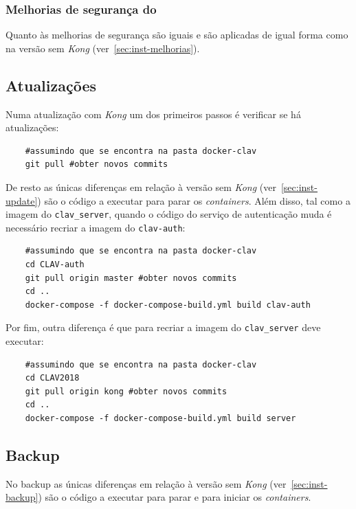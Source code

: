 \subsubsection{Melhorias de segurança do }

Quanto às melhorias de segurança são iguais e são aplicadas de igual forma como na versão sem \textit{Kong} (ver~\ref{sec:inst-melhorias}).

\subsection{Atualizações}

Numa atualização com \textit{Kong} um dos primeiros passos é verificar se há atualizações:
\footnotesize
\begin{verbatim}
    #assumindo que se encontra na pasta docker-clav
    git pull #obter novos commits
\end{verbatim}
\normalsize

De resto as únicas diferenças em relação à versão sem \textit{Kong} (ver~\ref{sec:inst-update}) são o código a executar para parar os \textit{containers}. Além disso, tal como a imagem do \texttt{clav\_server}, quando o código do serviço de autenticação muda é necessário recriar a imagem do \texttt{clav-auth}:

\footnotesize
\begin{verbatim}
    #assumindo que se encontra na pasta docker-clav
    cd CLAV-auth
    git pull origin master #obter novos commits
    cd ..
    docker-compose -f docker-compose-build.yml build clav-auth
\end{verbatim}
\normalsize

Por fim, outra diferença é que para recriar a imagem do \texttt{clav\_server} deve executar:

\footnotesize
\begin{verbatim}
    #assumindo que se encontra na pasta docker-clav
    cd CLAV2018
    git pull origin kong #obter novos commits
    cd ..
    docker-compose -f docker-compose-build.yml build server
\end{verbatim}
\normalsize

\subsection{Backup}

No backup as únicas diferenças em relação à versão sem \textit{Kong} (ver~\ref{sec:inst-backup}) são o código a executar para parar e para iniciar os \textit{containers}.

